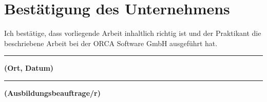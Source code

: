 \chapter{Bestätigung des Unternehmens}
Ich bestätige, dass vorliegende Arbeit inhaltlich richtig ist und der Praktikant die beschriebene Arbeit bei der ORCA Software GmbH ausgeführt hat.
\\
\newcommand\signature[1]{%
	\noindent\begin{minipage}{6cm}
		\noindent\vspace{3cm}\par
		\noindent\rule{6cm}{1pt}\par
		\noindent\textbf{#1}\par
\end{minipage}}
\newcommand\insertdate[1][\today]{\vfill\begin{flushright}#1\end{flushright}}

\signature{(Ort, Datum)}\hfill\signature{(Ausbildungsbeauftrage/r)}


